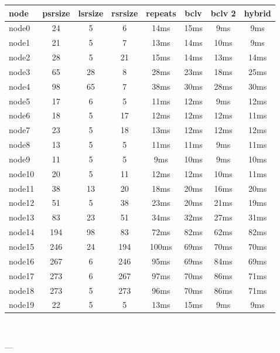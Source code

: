 

\begin{tabular}{|l|c|c|c|c|c|c|c|}
\hline node & psrsize & lsrsize & rsrsize   & repeats & bclv & bclv 2 & hybrid\\
    \hline node0 & 24 & 5 & 6 & 14ms & 15ms & 9ms & 9ms\\
    \hline node1 & 21 & 5 & 7 & 13ms & 14ms & 10ms & 9ms\\
    \hline node2 & 28 & 5 & 21 & 15ms & 14ms & 13ms & 14ms\\
    \hline node3 & 65 & 28 & 8 & 28ms & 23ms & 18ms & 25ms\\
    \hline node4 & 98 & 65 & 7 & 38ms & 30ms & 28ms & 30ms\\
    \hline node5 & 17 & 6 & 5 & 11ms & 12ms & 9ms & 12ms\\
    \hline node6 & 18 & 5 & 17 & 12ms & 12ms & 12ms & 11ms\\
    \hline node7 & 23 & 5 & 18 & 13ms & 12ms & 12ms & 12ms\\
    \hline node8 & 13 & 5 & 5 & 11ms & 11ms & 9ms & 11ms\\
    \hline node9 & 11 & 5 & 5 & 9ms & 10ms & 9ms & 10ms\\
    \hline node10 & 20 & 5 & 11 & 12ms & 12ms & 10ms & 11ms\\
    \hline node11 & 38 & 13 & 20 & 18ms & 20ms & 16ms & 20ms\\
    \hline node12 & 51 & 5 & 38 & 23ms & 20ms & 21ms & 19ms\\
    \hline node13 & 83 & 23 & 51 & 34ms & 32ms & 27ms & 31ms\\
    \hline node14 & 194 & 98 & 83 & 72ms & 82ms & 62ms & 82ms\\
    \hline node15 & 246 & 24 & 194 & 100ms & 69ms & 70ms & 70ms\\
    \hline node16 & 267 & 6 & 246 & 95ms & 69ms & 84ms & 69ms\\
    \hline node17 & 273 & 6 & 267 & 97ms & 70ms & 86ms & 71ms\\
    \hline node18 & 273 & 5 & 273 & 96ms & 70ms & 86ms & 71ms\\
    \hline node19 & 22 & 5 & 5 & 13ms & 15ms & 9ms & 9ms\\

\hline
\end{tabular} \

---


